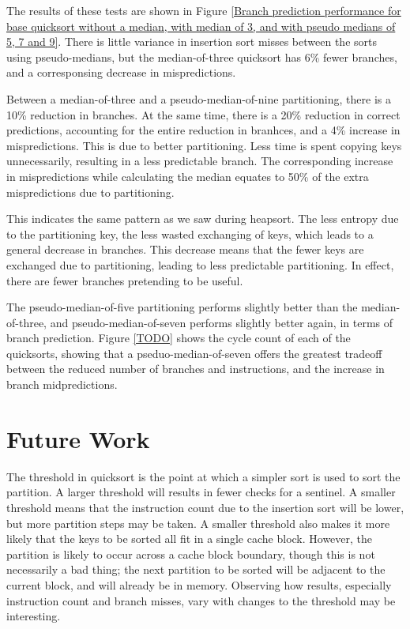 The results of these tests are shown in Figure \ref{Branch prediction
performance for base quicksort without a median, with median of 3, and with
pseudo medians of 5, 7 and 9}. There is little variance in insertion sort misses
between the sorts using pseudo-medians, but the median-of-three quicksort has
6\% fewer branches, and a corresponsing decrease in mispredictions.

Between a median-of-three and a pseudo-median-of-nine partitioning, there is a
10\% reduction in branches. At the same time, there is a 20\% reduction in
correct predictions, accounting for the entire reduction in branhces, and a 4\%
increase in mispredictions. This is due to better partitioning. Less time is
spent copying keys unnecessarily, resulting in a less predictable branch. The
corresponding increase in mispredictions while calculating the median equates to
50\% of the extra mispredictions due to partitioning.

This indicates the same pattern as we saw during heapsort.%
The less entropy due to the partitioning key, the less wasted exchanging of keys,
which leads to a general decrease in branches. This decrease means that the
fewer keys are exchanged due to partitioning, leading to less predictable
partitioning. In effect, there are fewer branches pretending to be useful.

The pseudo-median-of-five partitioning performs slightly better than the
median-of-three, and pseudo-median-of-seven performs slightly better again, in
terms of branch prediction. Figure \ref{TODO} shows the cycle count of each of
the quicksorts, showing that a pseduo-median-of-seven offers the greatest
tradeoff between the reduced number of branches and instructions, and the
increase in branch midpredictions. 



\section{Future Work}
The threshold in quicksort is the point at which a simpler sort is used to sort
the partition. A larger threshold will results in fewer checks for a sentinel. A
smaller threshold means that the instruction count due to the insertion sort
will be lower, but more partition steps may be taken. A smaller threshold also
makes it more likely that the keys to be sorted all fit in a single cache
block. However, the partition is likely to occur across a cache block boundary,
though this is not necessarily a bad thing; the next partition to be sorted will
be adjacent to the current block, and will already be in memory. Observing how
results, especially instruction count and branch misses, vary with changes 
to the threshold may be interesting.

